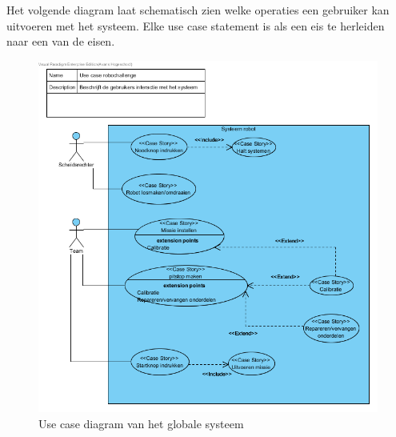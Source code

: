 \documentclass[12pt]{article} %
\begin{document}
Het volgende diagram laat schematisch zien welke operaties een gebruiker kan uitvoeren met het systeem. Elke use case statement is als een eis te herleiden naar een van de eisen.
\begin{center}
\begin{figure}
\includegraphics[scale=.9]{usecase.png}
\caption{Use case diagram van het globale systeem}
\label{fig:usecase}
\end{figure}
\end{center}
\clearpage
\newpage
\end{document}
